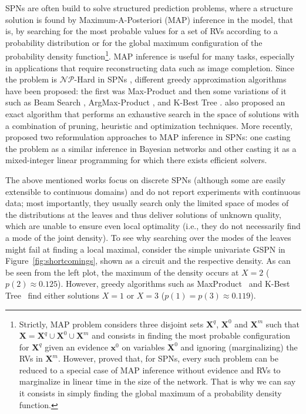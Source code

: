 \documentclass[12pt]{article}
\begin{document}
SPNs are often build to solve structured prediction problems, where a structure solution is found by Maximum-A-Posteriori (MAP) inference in the model, that is, by searching for the most probable values for a set of RVs according to a probability distribution or for the global maximum configuration of the probability density function\footnote{Strictly, MAP problem considers three disjoint sets $\mathbf{X}^q$, $\mathbf{X}^0$ and $\mathbf{X}^m$ such that $\mathbf{X} = \mathbf{X}^q \cup \mathbf{X}^0 \cup \mathbf{X}^m$ and consists in finding the most probable configuration for $\mathbf{X}^q$ given an evidence $\mathbf{x}^0$ on variables $\mathbf{X}^0$ and ignoring (marginalizing) the RVs in $\mathbf{X}^m$. However, \cite{Mei2017} proved that, for SPNs, every such problem can be reduced to a special case of MAP inference without evidence and RVs to marginalize in linear time in the size of the network. That is why we can say it consists in simply finding the global maximum of a probability density function.}. MAP inference is useful for many tasks, especially in applications that require reconstructing data such as image completion. Since the problem is $\mathcal{NP}$-Hard in SPNs \cite{Peharz2015, Peharz2016, Conaty2017}, different greedy approximation algorithms have been proposed: the first was Max-Product \cite{Poon2011} and then some variations of it such as Beam Search \cite{Park2002}, ArgMax-Product \cite{Conaty2017}, and K-Best Tree \cite{Mei2017}. \cite{Mei2017} also proposed an exact algorithm that performs an exhaustive search in the space of solutions with a combination of pruning, heuristic and optimization techniques. More recently, \cite{Maua2020} proposed two reformulation approaches to MAP inference in SPNs: one casting the problem as a similar inference in Bayesian networks and other casting it as a mixed-integer linear programming for which there exists efficient solvers.

The above mentioned works focus on discrete SPNs (although some are easily extensible to continuous domains) and do not report experiments with continuous data; most importantly, they usually search only the limited space of modes of the distributions at the leaves and thus deliver solutions of unknown quality, which are unable to ensure even local optimality (i.e., they do not necessarily find a mode of the joint density). To see why searching over the modes of the leaves might fail at finding a local maximal, consider the simple univariate GSPN in Figure~\ref{fig:shortcomings}, shown as a circuit and the respective density.
As can be seen from the left plot, the maximum of the density occurs at $X = 2$ ($p(2) \approx 0.125$). However, greedy algorithms such as MaxProduct~\cite{Poon2011} and K-Best Tree~\cite{Mei2017} find either solutions $X = 1$ or $X = 3$ ($p(1) = p(3) \approx 0.119$).
\end{document}
